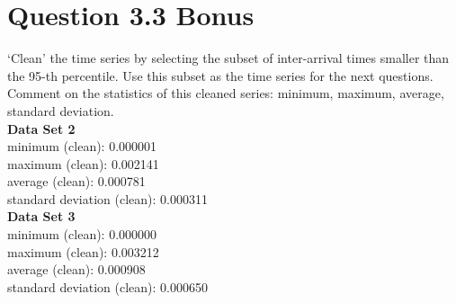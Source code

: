\documentclass{article}
\newenvironment{homeworkProblem}[1]{
	\section*{#1}
	}{
}
\begin{document}
\begin{homeworkProblem}{Question 3.3 Bonus}
`Clean' the time series by selecting the subset of inter-arrival times smaller than the 95-th percentile. Use this subset as the time series for the next questions. Comment on the statistics of this cleaned series: minimum, maximum, average, standard deviation.\\

\textbf{Data Set 2}\\
minimum (clean): 0.000001\\
maximum (clean): 0.002141\\
average (clean): 0.000781\\
standard deviation (clean): 0.000311\\

\textbf{Data Set 3}\\
minimum (clean): 0.000000\\
maximum (clean): 0.003212\\
average (clean): 0.000908\\
standard deviation (clean): 0.000650
\end{homeworkProblem}
\end{document}
